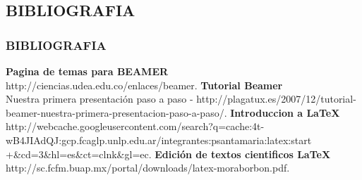 \documentclass{beamer}						%
\begin{document}
	\begin{frame}
		\section{BIBLIOGRAFIA}
		\frametitle{BIBLIOGRAFIA}
		
		\begin{thebibliography}{99}
			\normalsize
			 \textbf{Pagina de temas para BEAMER}\\ http://ciencias.udea.edu.co/enlaces/beamer.
			 \textbf{Tutorial Beamer}\\ Nuestra primera presentación paso a paso - http://plagatux.es/2007/12/tutorial-beamer-nuestra-primera-presentacion-paso-a-paso/.
			 \textbf{Introduccion a LaTeX}\\ http://webcache.googleusercontent.com/search?q=cache:4t-wB4JIAdQJ:gcp.fcaglp.unlp.edu.ar/integrantes:psantamaria:latex:start\\+\&cd=3\&hl=es\&ct=clnk\&gl=ec.
			 \textbf{Edición de textos cientificos \LaTeX}\\http://sc.fcfm.buap.mx/portal/downloads/latex-moraborbon.pdf.
		\end{thebibliography}
		
	\end{frame}
	
\end{document}
